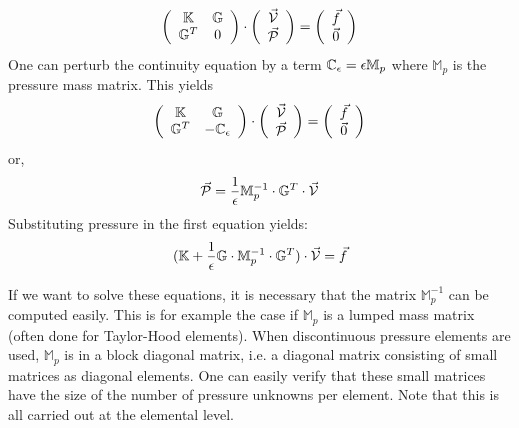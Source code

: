 \[
\left( \begin{array}{cc}
{\mathbb{K}} & {\mathbb{G}}  \\ 
{\mathbb{G}}^T & 0 
\end{array} \right) \cdot
\left( \begin{array}{c}  \vec{\cal V} \\ \vec{\cal P}  \end{array} \right) = 
\left( \begin{array}{c}  \vec{f} \\ \vec{0}  \end{array} \right) 
\]
One can perturb the continuity equation 
by a term ${\mathbb{C}}_\epsilon = \epsilon \mathbb{M}_p$
where $\mathbb{M}_p$ is the pressure mass matrix.
This yields
\[
\left( \begin{array}{cc}
{\mathbb{K}} & {\mathbb{G}}  \\ {\mathbb{G}}^T & -\mathbb{C}_\epsilon
\end{array} \right) \cdot
\left( \begin{array}{c}  \vec{\cal V} \\ \vec{\cal P}  \end{array} \right) = 
\left( \begin{array}{c}  \vec{f} \\ \vec{0}  \end{array} \right) 
\]
or,
\[
\vec{\cal P}= \frac{1}{\epsilon} \mathbb{M}_p^{-1} \cdot  {\mathbb{G}}^T \cdot \vec{\cal V}
\]
Substituting pressure in the first equation yields:
\begin{equation}
({\mathbb{K}} + \frac{1}{\epsilon} {\mathbb{G}} \cdot \mathbb{M}_p^{-1} \cdot {\mathbb{G}}^T ) \cdot \vec{\cal V} = \vec{f} 
\label{eqdpf}
\end{equation}

If we want to solve these equations, it is necessary that the matrix $\mathbb{M}_p^{-1}$
can be computed easily.
This is for example the case if $\mathbb{M}_p$
is a lumped mass matrix (often done for Taylor-Hood elements). 
When discontinuous pressure elements are used,
$\mathbb{M}_p$ is in a block diagonal matrix, i.e. a diagonal matrix consisting of small matrices as diagonal elements. One can easily verify that these small matrices have the size of the number of pressure unknowns per element. Note that this is all carried out at the elemental level.








